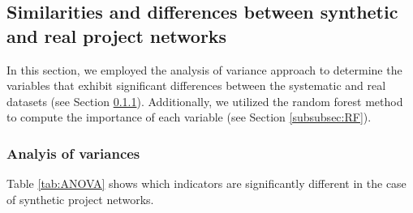 \documentclass[preprint,
3p]{elsarticle} %
\begin{document}
\subsection{Similarities and differences between synthetic and real
project networks}\label{subsec:simsynth}

In this section, we employed the analysis of variance approach to
determine the variables that exhibit significant differences between the
systematic and real datasets (see Section \ref{subsubsec:ANOVA}).
Additionally, we utilized the random forest method to compute the
importance of each variable (see Section \ref{subsubsec:RF}).

\subsubsection{Analyis of variances}\label{subsubsec:ANOVA}

Table \ref{tab:ANOVA} shows which indicators are significantly different
in the case of synthetic project networks.

\begingroup\fontsize{8}{10}\selectfont
\end{document}
